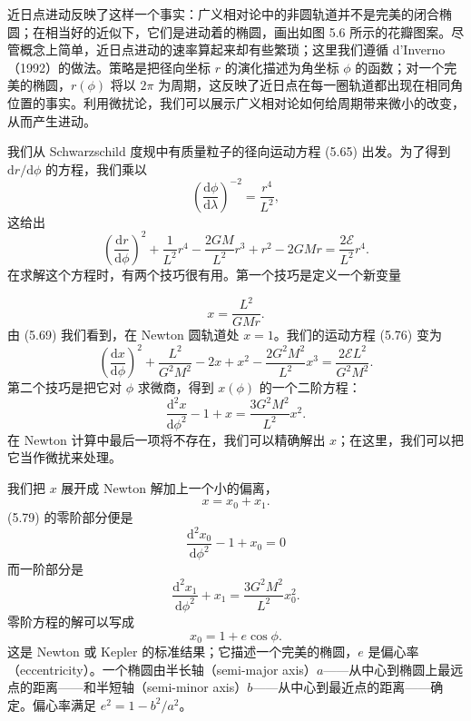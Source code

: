 近日点进动反映了这样一个事实：广义相对论中的非圆轨道并不是完美的闭合椭圆；在相当好的近似下，它们是进动着的椭圆，画出如图 5.6 所示的花瓣图案。尽管概念上简单，近日点进动的速率算起来却有些繁琐；这里我们遵循 d'Inverno（1992）的做法。策略是把径向坐标 $r$ 的演化描述为角坐标 $\phi$ 的函数；对一个完美的椭圆，$r(\phi)$ 将以 $2\pi$ 为周期，这反映了近日点在每一圈轨道都出现在相同角位置的事实。利用微扰论，我们可以展示广义相对论如何给周期带来微小的改变，从而产生进动。

我们从 Schwarzschild 度规中有质量粒子的径向运动方程 (5.65) 出发。为了得到 $\mathrm{d}r/\mathrm{d}\phi$ 的方程，我们乘以
\begin{equation*}
\left(\frac{\mathrm{d}\phi}{\mathrm{d}\lambda}\right)^{-2} = \frac{r^4}{L^2},
\tag{5.75}
\end{equation*}
这给出
\begin{equation*}
\left(\frac{\mathrm{d}r}{\mathrm{d}\phi}\right)^2 + \frac{1}{L^2}r^4 - \frac{2GM}{L^2}r^3 + r^2 - 2GMr = \frac{2\mathcal{E}}{L^2}r^4.
\tag{5.76}
\end{equation*}
在求解这个方程时，有两个技巧很有用。第一个技巧是定义一个新变量

\begin{equation*}
x = \frac{L^2}{GMr}.
\tag{5.77}
\end{equation*}
由 (5.69) 我们看到，在 Newton 圆轨道处 $x = 1$。我们的运动方程 (5.76) 变为
\begin{equation*}
\left(\frac{\mathrm{d}x}{\mathrm{d}\phi}\right)^2 + \frac{L^2}{G^2M^2} - 2x + x^2 - \frac{2G^2M^2}{L^2}x^3 = \frac{2\mathcal{E}L^2}{G^2M^2}.
\tag{5.78}
\end{equation*}
第二个技巧是把它对 $\phi$ 求微商，得到 $x(\phi)$ 的一个二阶方程：
\begin{equation*}
\frac{\mathrm{d}^2 x}{\mathrm{d}\phi^2} - 1 + x = \frac{3G^2M^2}{L^2}x^2.
\tag{5.79}
\end{equation*}
在 Newton 计算中最后一项将不存在，我们可以精确解出 $x$；在这里，我们可以把它当作微扰来处理。

我们把 $x$ 展开成 Newton 解加上一个小的偏离，
\begin{equation*}
x = x_0 + x_1.
\tag{5.80}
\end{equation*}
(5.79) 的零阶部分便是
\begin{equation*}
\frac{\mathrm{d}^2 x_0}{\mathrm{d}\phi^2} - 1 + x_0 = 0
\tag{5.81}
\end{equation*}
而一阶部分是
\begin{equation*}
\frac{\mathrm{d}^2 x_1}{\mathrm{d}\phi^2} + x_1 = \frac{3G^2M^2}{L^2}x_0^2.
\tag{5.82}
\end{equation*}
零阶方程的解可以写成
\begin{equation*}
x_0 = 1 + e\cos\phi.
\tag{5.83}
\end{equation*}
这是 Newton 或 Kepler 的标准结果；它描述一个完美的椭圆，$e$ 是偏心率（eccentricity）。一个椭圆由半长轴（semi-major axis）$a$——从中心到椭圆上最远点的距离——和半短轴（semi-minor axis）$b$——从中心到最近点的距离——确定。偏心率满足 $e^2 = 1 - b^2/a^2$。

